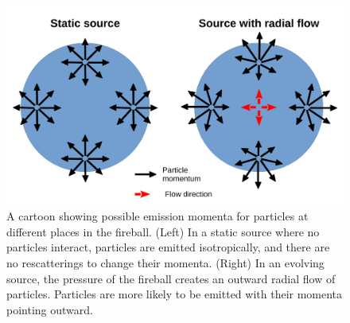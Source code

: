 \begin{figure}[hbt]
\includegraphics[width=36pc]{Figures/HomemadeFigures/FlowAndMomentum.pdf}
\caption[Effect of radial flow on momentum]{A cartoon showing possible emission momenta for particles at different places in the fireball.
(Left) In a static source where no particles interact, particles are emitted isotropically, and there are no rescatterings to change their momenta.
(Right) In an evolving source, the pressure of the fireball creates an outward radial flow of particles.
Particles are more likely to be emitted with their momenta pointing outward.}
\label{fig:FlowAndMomentum}
\end{figure}


